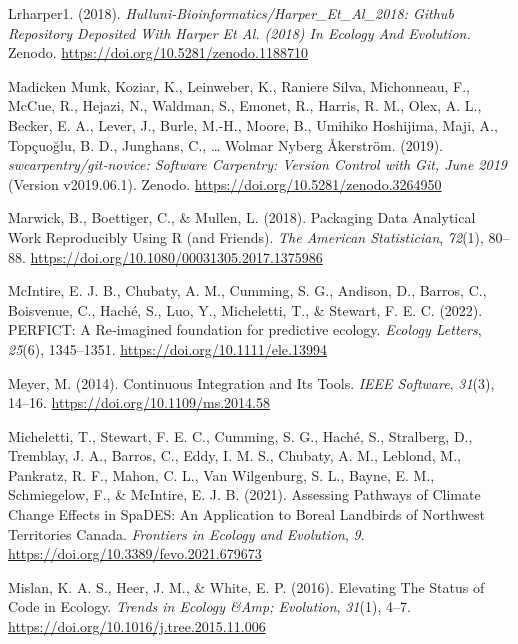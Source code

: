 \begin{CSLReferences}{1}{0}
\leavevmode{}%
Lrharper1. (2018). \emph{Hulluni-Bioinformatics/Harper\_Et\_Al\_2018: Github Repository Deposited With Harper Et Al. (2018) In Ecology And Evolution.} Zenodo. \url{https://doi.org/10.5281/zenodo.1188710}

\leavevmode{}%
Madicken Munk, Koziar, K., Leinweber, K., Raniere Silva, Michonneau, F., McCue, R., Hejazi, N., Waldman, S., Emonet, R., Harris, R. M., Olex, A. L., Becker, E. A., Lever, J., Burle, M.-H., Moore, B., Umihiko Hoshijima, Maji, A., Topçuoğlu, B. D., Junghans, C., \ldots{} Wolmar Nyberg Åkerström. (2019). \emph{swcarpentry/git-novice: Software Carpentry: Version Control with Git, June 2019} (Version v2019.06.1). Zenodo. \url{https://doi.org/10.5281/zenodo.3264950}

\leavevmode{}%
Marwick, B., Boettiger, C., \& Mullen, L. (2018). Packaging Data Analytical Work Reproducibly Using R (and Friends). \emph{The American Statistician}, \emph{72}(1), 80--88. \url{https://doi.org/10.1080/00031305.2017.1375986}

\leavevmode{}%
McIntire, E. J. B., Chubaty, A. M., Cumming, S. G., Andison, D., Barros, C., Boisvenue, C., Haché, S., Luo, Y., Micheletti, T., \& Stewart, F. E. C. (2022). PERFICT: A Re‐imagined foundation for predictive ecology. \emph{Ecology Letters}, \emph{25}(6), 1345--1351. \url{https://doi.org/10.1111/ele.13994}

\leavevmode{}%
Meyer, M. (2014). Continuous Integration and Its Tools. \emph{IEEE Software}, \emph{31}(3), 14--16. \url{https://doi.org/10.1109/ms.2014.58}

\leavevmode{}%
Micheletti, T., Stewart, F. E. C., Cumming, S. G., Haché, S., Stralberg, D., Tremblay, J. A., Barros, C., Eddy, I. M. S., Chubaty, A. M., Leblond, M., Pankratz, R. F., Mahon, C. L., Van Wilgenburg, S. L., Bayne, E. M., Schmiegelow, F., \& McIntire, E. J. B. (2021). Assessing Pathways of Climate Change Effects in SpaDES: An Application to Boreal Landbirds of Northwest Territories Canada. \emph{Frontiers in Ecology and Evolution}, \emph{9}. \url{https://doi.org/10.3389/fevo.2021.679673}

\leavevmode{}%
Mislan, K. A. S., Heer, J. M., \& White, E. P. (2016). Elevating The Status of Code in Ecology. \emph{Trends in Ecology \&Amp; Evolution}, \emph{31}(1), 4--7. \url{https://doi.org/10.1016/j.tree.2015.11.006}


\end{CSLReferences}
